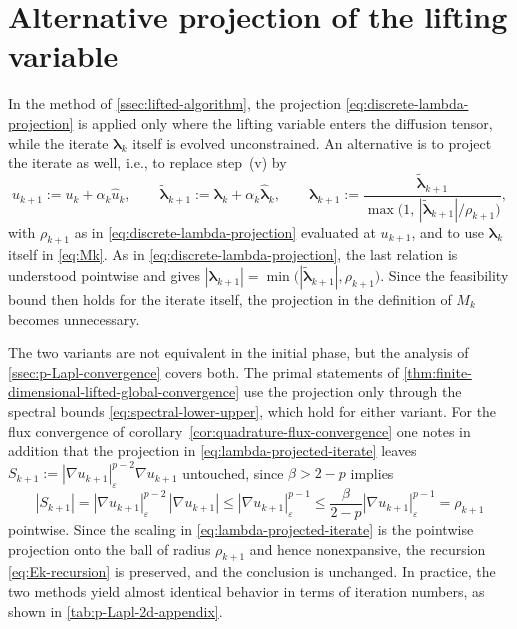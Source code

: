 \documentclass[11pt,pdflatex,sn-mathphys-num]{sn-jnl}
\theoremstyle{thmstyleone}%
\theoremstyle{thmstyletwo}%
\theoremstyle{thmstylethree}%
\newcommand{\bs}[1]{\ensuremath{\boldsymbol{#1}}}
\begin{document}
\section{Alternative projection of the lifting variable}
\label{app:project}
In the method of \cref{ssec:lifted-algorithm}, the projection \eqref{eq:discrete-lambda-projection} is applied only where 
the lifting variable enters the diffusion tensor, while the iterate $\bs\lambda_k$ itself is evolved unconstrained. An alternative is to project the iterate as well, i.e., to replace step~(v) by
\begin{equation}\label{eq:lambda-projected-iterate}
  u_{k+1}:=u_k+\alpha_k\hat u_k,
  \qquad
  \widetilde{\bs\lambda}_{k+1}:=\bs\lambda_k+\alpha_k\hat{\bs\lambda}_k,
  \qquad
  \bs\lambda_{k+1}:=\frac{\widetilde{\bs\lambda}_{k+1}}{\max\bigl(1,\,|\widetilde{\bs\lambda}_{k+1}|/\rho_{k+1}\bigr)},
\end{equation}
with $\rho_{k+1}$ as in \eqref{eq:discrete-lambda-projection} evaluated at $u_{k+1}$, and to use $\bs\lambda_k$ itself in \eqref{eq:Mk}. As in \eqref{eq:discrete-lambda-projection}, the last relation is understood pointwise 
and gives $|\bs\lambda_{k+1}|=\min\bigl(|\widetilde{\bs\lambda}_{k+1}|,\rho_{k+1}\bigr)$. Since the feasibility bound then holds for the iterate itself, the projection in the definition of $M_k$ becomes unnecessary.

The two variants are not equivalent in the initial phase, but the analysis of \cref{ssec:p-Lapl-convergence} covers both. The primal statements of \cref{thm:finite-dimensional-lifted-global-convergence} use the projection 
only through the spectral bounds \eqref{eq:spectral-lower-upper}, which hold for either variant. For the flux convergence of corollary~\ref{cor:quadrature-flux-convergence} one notes in addition that the projection in \eqref{eq:lambda-projected-iterate} leaves $S_{k+1}:=|\nabla u_{k+1}|_\varepsilon^{p-2}\nabla u_{k+1}$ untouched, since $\beta>2-p$ implies
\begin{equation*}
  |S_{k+1}|
  =|\nabla u_{k+1}|_\varepsilon^{p-2}\,|\nabla u_{k+1}|
  \le |\nabla u_{k+1}|_\varepsilon^{p-1}
  \le\frac{\beta}{2-p}|\nabla u_{k+1}|_\varepsilon^{p-1}
  =\rho_{k+1}
\end{equation*}
pointwise. Since the scaling in \eqref{eq:lambda-projected-iterate} is
the pointwise projection onto the ball of radius $\rho_{k+1}$ and
hence nonexpansive, the recursion \eqref{eq:Ek-recursion} is preserved, and the conclusion is unchanged.  In practice, the two methods yield
almost identical behavior in terms of iteration numbers, as shown in \cref{tab:p-Lapl-2d-appendix}.
\end{document}

